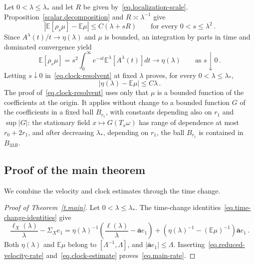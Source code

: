 \documentclass[11pt]{amsart}
\theoremstyle{definition}
\theoremstyle{remark}
\numberwithin{equation}{section}
\newcommand{\E}{\mathbb E}
\newcommand{\ahom}{\overline{\mathbf a}}
\begin{document}
Let $0<\lambda\leq\lambda_*$ and let $R$ be given by~\eqref{eq.localization-scale}. Proposition~\ref{scalar.decomposition} and $R\asymp\lambda^{-1}$ give
\begin{equation}\label{eq.clock-resolvent}
 |\E[\rho_s\mu]-\E\mu|\leq C(\lambda+sR)
 \qquad\text{for every }0<s\leq\lambda^2\, .
\end{equation}
Since $A^\lambda(t)/t\to\eta(\lambda)$ and $\mu$ is bounded, an integration by parts in time and dominated convergence yield
\begin{equation*}
 \E[\rho_s\mu]
 =s^2\int_0^\infty e^{-st}\mathbb E^\lambda[A^\lambda(t)]dt
 \longrightarrow\eta(\lambda)
 \qquad\text{as }s\downarrow0\, .
\end{equation*}
Letting $s\downarrow0$ in~\eqref{eq.clock-resolvent} at fixed $\lambda$ proves, for every $0<\lambda\leq\lambda_*$,
\begin{equation}\label{eq.clock-estimate}
 |\eta(\lambda)-\E\mu|\leq C\lambda\, .
\end{equation}
The proof of~\eqref{eq.clock-resolvent} uses only that $\mu$ is a bounded function of the coefficients at the origin. It applies without change to a bounded function $G$ of the coefficients in a fixed ball $B_{r_1}$, with constants depending also on $r_1$ and $\sup|G|$: the stationary field $x\mapsto G(T_x\omega)$ has range of dependence at most $r_0+2r_1$, and after decreasing $\lambda_*$, depending on $r_1$, the ball $B_{r_1}$ is contained in $B_{33R}$.

\subsection{Proof of the main theorem}\label{ss.proof-main}

We combine the velocity and clock estimates through the time change.

\begin{proof}[Proof of Theorem~\ref{t.main}]
Let $0<\lambda\leq\lambda_*$. The time-change identities~\eqref{eq.time-change-identities} give
\begin{equation*}
 \frac{\ell_X(\lambda)}\lambda-\Sigma_Xe_1
 =\eta(\lambda)^{-1}
 \left(\frac{\ell(\lambda)}\lambda-\ahom e_1\right)
 +\left(\eta(\lambda)^{-1}-(\E\mu)^{-1}\right)\ahom e_1\, .
\end{equation*}
Both $\eta(\lambda)$ and $\E\mu$ belong to $[\Lambda^{-1},\Lambda]$, and $|\ahom e_1|\leq\Lambda$. Inserting~\eqref{eq.reduced-velocity-rate} and~\eqref{eq.clock-estimate} proves~\eqref{eq.main-rate}.
\end{proof}
\end{document}

